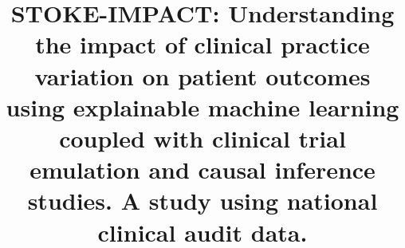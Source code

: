 
\title{STOKE-IMPACT: Understanding the impact of clinical practice variation on patient outcomes using explainable machine learning coupled with clinical trial emulation and causal inference studies. A study using national clinical audit data.}
\author{} %
\date{} %